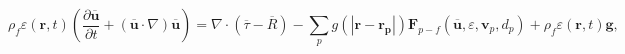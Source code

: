 \begin{equation}
\rho_f \varepsilon (\mathbf{r}, t) \left(\frac{\partial
\mathbf{\overline{u}}}{\partial t} + ( \mathbf{\overline{u}} \cdot \nabla)
\mathbf{\overline{u}} \right) = 
\nabla \cdot (\overline{\tau} - \overline{R}) -\sum_{p}{g(|\mathbf{r} -
\mathbf{r_p}|)\mathbf{F}_{p-f}(\mathbf{\overline{u}}, \varepsilon,
\mathbf{v}_p, d_p) + \rho_f \varepsilon (\mathbf{r}, t) \mathbf{g}} ,
 \label{eq:nsmomentumequation2}
\end{equation}
